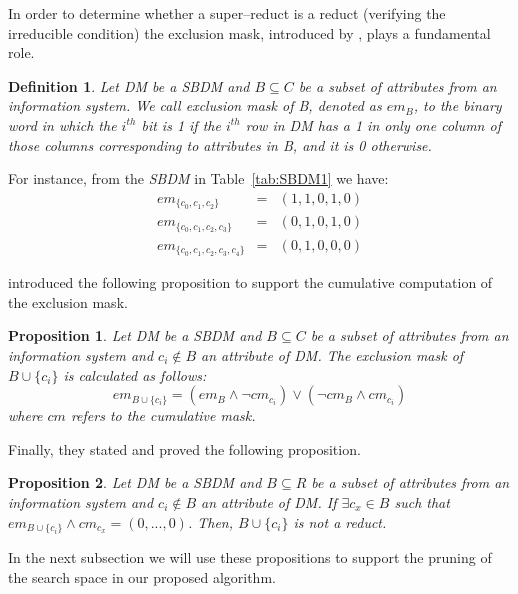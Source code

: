 \documentclass[authoryear,preprint,review,12pt]{elsarticle}
\newtheorem{proposition}{Proposition}
\newtheorem{definition}{Definition}
\begin{document}
	In order to determine whether a super--reduct is a reduct (verifying the irreducible condition) the
	exclusion mask, introduced by \cite{Lias09}, plays a fundamental role. 
	
	\begin{definition}\label{def:exclusion}
		Let DM be a SBDM and $B \subseteq C$ be a subset of attributes from an information system. We call exclusion mask of B, denoted as $em_B$, to the binary word in which the $i^{\mathit{th}}$ bit is 1 if the $i^{\mathit{th}}$ row in DM has a 1 in only one column of those columns corresponding to attributes in B, and it is 0 otherwise.
	\end{definition}
	
	For instance, from the \textit{SBDM} in Table~\ref{tab:SBDM1} we have:
	$$\begin{array}{lcc}
	  em_{\lbrace c_0,c_1,c_2\rbrace}         &=& (1,1,0,1,0)\\
	  em_{\lbrace c_0,c_1,c_2,c_3\rbrace}     &=& (0,1,0,1,0)\\
	  em_{\lbrace c_0,c_1,c_2,c_3,c_4\rbrace} &=& (0,1,0,0,0)
	\end{array}$$
	
	\cite{Lias13} introduced the following proposition to support the cumulative computation of the exclusion mask.
	
	\begin{proposition}\label{prop:cumul} 
		Let DM be a SBDM and $B \subseteq C$ be a subset of attributes from an information system and $c_i \notin B$ an attribute of DM. The exclusion mask of $B \cup \lbrace c_i\rbrace$ is calculated as follows: $$em_{B \cup \lbrace c_i\rbrace}=(em_B \wedge \neg cm_{c_i}) \vee (\neg cm_B \wedge cm_{c_i})$$	where $cm$ refers to the cumulative mask.
	\end{proposition}
	
	Finally, they stated and proved the following proposition.
	
	\begin{proposition}\label{prop:exclude} 
		Let DM be a SBDM and $B \subseteq R$ be a subset of attributes from an information system and $c_i \notin B$ an attribute of DM.
		If $\exists c_x \in B$ such that $em_{B \cup \lbrace c_i\rbrace} \wedge cm_{c_x}=(0,...,0)$. Then, $B \cup \lbrace c_i\rbrace$	is not a reduct.
	\end{proposition}
	
	In the next subsection we will use these propositions to support the pruning of the search space in our proposed algorithm.
\end{document}
